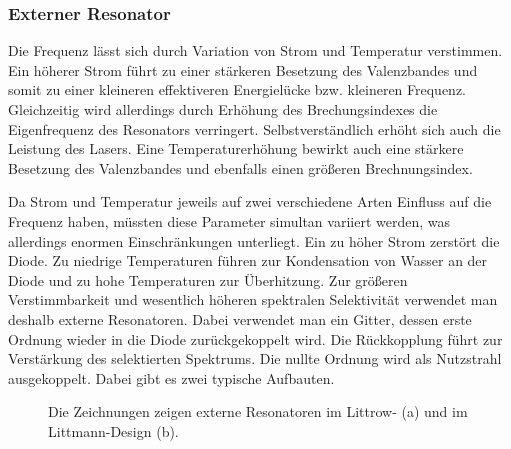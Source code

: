 \subsubsection{Externer Resonator}\label{subsubsec:externer_resonator}
Die Frequenz lässt sich durch Variation von Strom und Temperatur verstimmen. Ein
höherer Strom führt zu einer stärkeren Besetzung des Valenzbandes und somit zu
einer kleineren effektiveren Energielücke bzw. kleineren Frequenz. Gleichzeitig
wird allerdings durch Erhöhung des Brechungsindexes die Eigenfrequenz des
Resonators verringert. Selbstverständlich erhöht sich auch die Leistung des
Lasers. Eine Temperaturerhöhung bewirkt auch eine stärkere Besetzung des
Valenzbandes und ebenfalls einen größeren Brechnungsindex.\par
Da Strom und Temperatur jeweils auf zwei verschiedene Arten Einfluss auf die
Frequenz haben, müssten diese Parameter simultan variiert werden, was
allerdings enormen Einschränkungen unterliegt. Ein zu höher Strom zerstört die
Diode. Zu niedrige Temperaturen führen zur Kondensation von Wasser an der Diode
und zu hohe Temperaturen zur Überhitzung. Zur größeren Verstimmbarkeit und wesentlich
höheren spektralen Selektivität verwendet man deshalb externe Resonatoren. Dabei
verwendet man ein Gitter, dessen erste Ordnung wieder in die Diode
zurückgekoppelt wird. Die Rückkopplung führt zur Verstärkung des selektierten Spektrums. Die
nullte Ordnung wird als Nutzstrahl ausgekoppelt. Dabei gibt es zwei typische
Aufbauten.\par
\begin{figure}[h]
 	\centering
	\caption[externe Resonatoren - Aufbau]{Die Zeichnungen zeigen externe
	Resonatoren im Littrow- (a) und im Littmann-Design
	(b).}\label{fig:externe_resonatoren_aufbau}
\end{figure}
